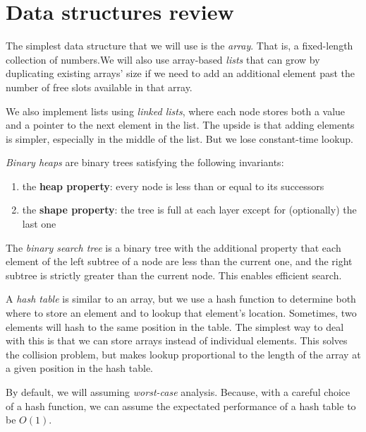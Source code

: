 \documentclass[titlepage, 12pt, leqno]{article}
\begin{document}
\pagebreak
\section{Data structures review}
The simplest data structure that we will use is the \textit{array}. That is, a
fixed-length collection of numbers.We will also use array-based \textit{lists}
that can grow by duplicating existing arrays' size if we need to add an
additional element past the number of free slots available in that array.

We also implement lists using \textit{linked lists}, where each node stores
both a value and a pointer to the next element in the list. The upside is that
adding elements is simpler, especially in the middle of the list. But we lose
constant-time lookup.

\textit{Binary heaps} are binary trees satisfying the following invariants:
\begin{enumerate}
    \item the \textbf{heap property}: every node is less than or equal to its
        successors
    \item the \textbf{shape property}: the tree is full at each layer except for
        (optionally) the last one
\end{enumerate}

The \textit{binary search tree} is a binary tree with the additional property
that each element of the left subtree of a node are less than the current one, 
and the right subtree is strictly greater than the current node. This enables
efficient search.

A \textit{hash table} is similar to an array, but we use a hash function to
determine both where to store an element and to lookup that element's location.
Sometimes, two elements will hash to the same position in the table. The 
simplest way to deal with this is that we can store arrays instead of individual
elements. This solves the collision problem, but makes lookup proportional to
the length of the array at a given position in the hash table.

\begin{note}
    By default, we will assuming \textit{worst-case} analysis. Because, with a
    careful choice of a hash function, we can assume the expectated performance
    of a hash table to be $O(1)$.
\end{note}
\end{document}
